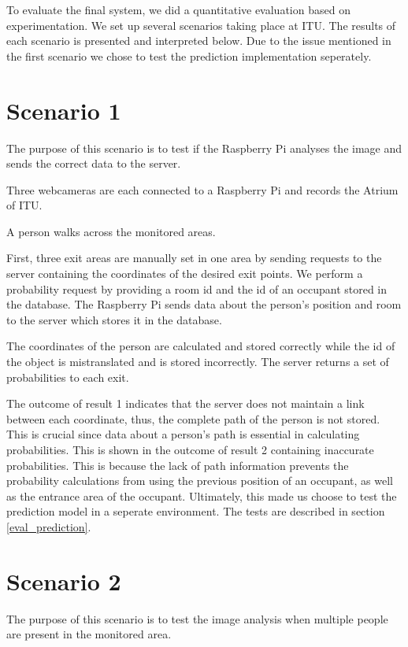 To evaluate the final system, we did a quantitative evaluation based on experimentation. We set up several scenarios taking place at ITU. The results of each scenario is presented and interpreted below. Due to the issue mentioned in the first scenario we chose to test the prediction implementation seperately.

\section{Scenario 1}
The purpose of this scenario is to test if the Raspberry Pi analyses the image and sends the correct data to the server. 

Three webcameras are each connected to a Raspberry Pi and records the Atrium of ITU. 

A person walks across the monitored areas. 

First, three exit areas are manually set in one area by sending requests to the server containing the coordinates of the desired exit points. We perform a probability request by providing a room id and the id of an occupant stored in the database. The Raspberry Pi sends data about the person's position and room to the server which stores it in the database. 

\begin{enumerate}
The coordinates of the person are calculated and stored correctly while the id of the object is mistranslated and is stored incorrectly. 
The server returns a set of probabilities to each exit. 
\end{enumerate}

The outcome of result 1 indicates that the server does not maintain a link between each coordinate, thus, the complete path of the person is not stored. This is crucial since data about a person's path is essential in calculating probabilities. This is shown in the outcome of result 2 containing inaccurate probabilities. This is because the lack of path information prevents the probability calculations from using the previous position of an occupant, as well as the entrance area of the occupant. Ultimately, this made us choose to test the prediction model in a seperate environment. The tests are described in section \ref{eval_prediction}.

\section{Scenario 2}
The purpose of this scenario is to test the image analysis when multiple people are present in the monitored area.

